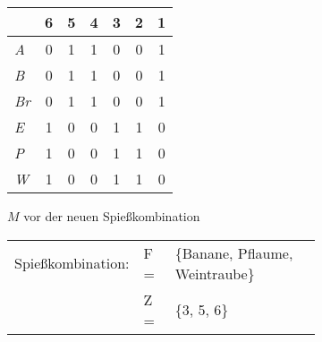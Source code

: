 \begin{figure}[H]
\vspace{-0.7cm}
\caption{Beide Abbildungen stellen die Adjazenzmatrix für das Beispiel aus der Aufgabenstellung dar.
Die Buchstaben in der ersten Spalte stehen für die entsprechenden Obstsorten
und die Zahlen in der ersten Zeile stehen für die Indizes aus demselben Beispiel (s. auch \ref{example:0}).\\
Auf der Abb. \ref{fig:matrix-danach} stehen $bn$ und $br$ für die entsprechenden Bitmasken.}
\begin{subfigure}[b]{.39\textwidth}
\centering
\begin{tabular}{>{\itshape}l|c|c|c|c|c|c|}
 & 6 & 5 & 4 & 3 & 2 & 1 \\ \hline
A & 0 & 1 & 1 &0 & 0 & 1 \\ \hline 
B & 0 & 1 & 1 &0 & 0 & 1 \\ \hline 
Br & 0 & 1 & 1 &0 & 0 & 1 \\ \hline 
E & 1 & 0 & 0 & 1 & 1 & 0 \\ \hline 
P & 1 & 0 & 0 & 1 & 1 & 0 \\ \hline 
W & 1 & 0 & 0 & 1 & 1 & 0 \\ \hline 
\end{tabular}
\caption{$M$ vor der neuen Spießkombination}
\label{fig:matrix-anfang}
\end{subfigure}
\begin{subfigure}[b]{.59\textwidth}
\vspace{0.25cm}
\begin{tabular}{lll}
Spießkombination: & F =& \{Banane, Pflaume, Weintraube\} \\
 				  & Z =& \{3, 5, 6\}
\end{tabular}
\centering


\end{subfigure}
\end{figure}
